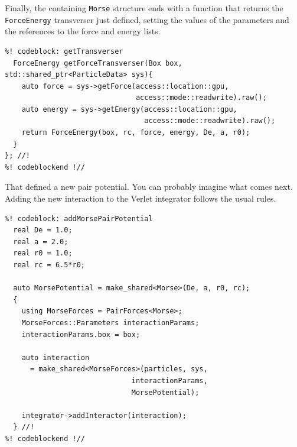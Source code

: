 Finally, the containing \texttt{Morse} structure ends with a function that 
returns the \texttt{ForceEnergy} transverser just defined, setting the values of 
the parameters and the references to the force and energy lists.
\begin{lstlisting}
%! codeblock: getTransverser
  ForceEnergy getForceTransverser(Box box, std::shared_ptr<ParticleData> sys){
    auto force = sys->getForce(access::location::gpu,
                               access::mode::readwrite).raw();
    auto energy = sys->getEnergy(access::location::gpu,
                                 access::mode::readwrite).raw();
    return ForceEnergy(box, rc, force, energy, De, a, r0);
  }
}; //!
%! codeblockend !//
\end{lstlisting}

That defined a new pair potential. You can probably imagine what comes next.
Adding the new interaction to the Verlet integrator follows the usual rules.
\begin{lstlisting}
%! codeblock: addMorsePairPotential
  real De = 1.0;
  real a = 2.0;
  real r0 = 1.0;
  real rc = 6.5*r0;

  auto MorsePotential = make_shared<Morse>(De, a, r0, rc);
  {
    using MorseForces = PairForces<Morse>;
    MorseForces::Parameters interactionParams;
    interactionParams.box = box;

    auto interaction
      = make_shared<MorseForces>(particles, sys,
                              interactionParams,
                              MorsePotential);

    integrator->addInteractor(interaction);
  } //!
%! codeblockend !//
\end{lstlisting}


